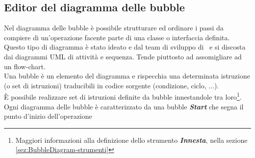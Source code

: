 \documentclass[../ManualeUtente.tex]{subfiles}
\begin{document}
		\subsection{Editor del diagramma delle bubble}\label{sez:BubbleDiagram}
			Nel diagramma delle bubble è possibile strutturare ed ordinare i passi da compiere di un'operazione
			facente parte di una classe o interfaccia definita.
			Questo tipo di diagramma è stato ideato e dal team di sviluppo di \progetto\
			e si discosta dai diagrammi UML di attività e sequenza. Tende piuttosto ad assomigliare ad un
			flow-chart.\\
			Una bubble è un elemento del diagramma e rispecchia una determinata istruzione (o set di
			istruzioni) traducibili in codice sorgente (condizione, ciclo, ...).\\
			È possibile realizzare set di istruzioni definite da bubble innestandole tra loro\footnote{Maggiori informazioni alla definizione dello strumento \textit{\textbf{Innesta}}, nella sezione \ref{sez:BubbleDiagram-strumenti}}.
			Ogni diagramma delle bubble è caratterizzato da una bubble \textit{\textbf{Start}} che segna
			il punto d'inizio dell'operazione
\end{document}
